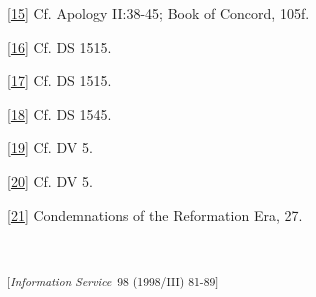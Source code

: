 \hyperref[r15]{}\label{15}{}{[}\hyperref[r15]{15}{]} Cf.
Apology II:38-45; Book of Concord, 105f.

\hyperref[r16]{}\label{16}{}{[}\hyperref[r16]{16}{]} Cf.
DS 1515.

\hyperref[r17]{}\label{17}{}{[}\hyperref[r17]{17}{]} Cf.
DS 1515.

\hyperref[r18]{}\label{18}{}{[}\hyperref[r18]{18}{]} Cf.
DS 1545.

\hyperref[r19]{}\label{19}{}{[}\hyperref[r19]{19}{]} Cf.
DV 5.

\hyperref[r20]{}\label{20}{}{[}\hyperref[r20]{20}{]} Cf.
DV 5.

\label{21}{}{[}\hyperref[r21]{21}{]} Condemnations of the
Reformation Era, 27.

~

\textsuperscript{{[}\emph{Information Service~}98 (1998/III) 81-89{]}}

~
